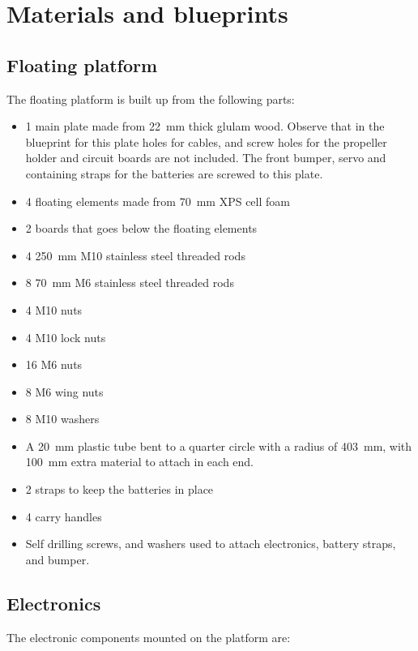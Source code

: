 \section{Materials and blueprints}

\subsection{Floating platform}

The floating platform is built up from the following parts:

\begin{itemize}
  \item 1 main plate made from 22~mm thick glulam wood. Observe that in the
    blueprint for this plate holes for cables, and screw holes for the
    propeller holder and circuit boards are not included. The front bumper,
    servo and containing straps for the batteries are screwed to this plate.
  \item 4 floating elements made from 70~mm XPS cell foam
  \item 2 boards that goes below the floating elements
  \item 4 250~mm M10 stainless steel threaded rods
  \item 8 70~mm M6 stainless steel threaded rods
  \item 4 M10 nuts
  \item 4 M10 lock nuts
  \item 16 M6 nuts
  \item 8 M6 wing nuts
  \item 8 M10 washers
  \item A 20~mm plastic tube bent to a quarter circle with a radius of 403~mm,
    with 100~mm extra material to attach in each end.
  \item 2 straps to keep the batteries in place
  \item 4 carry handles
  \item Self drilling screws, and washers used to attach electronics, battery
    straps, and bumper.
\end{itemize}

\subsection{Electronics}

The electronic components mounted on the platform are:

